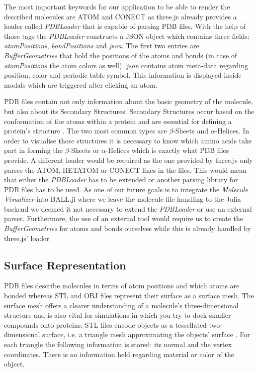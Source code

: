 The most important keywords for our application to be able to render the described molecules are ATOM and CONECT as three.js already provides a loader called \textit{PDBLoader} that is capable of parsing PDB files. With the help of those tags the \textit{PDBLoader} constructs a JSON object which contains three fields: \textit{atomPositions}, \textit{bondPositions} and \textit{json}. The first two entries are \textit{BufferGeometries} that hold the positions of the atoms and bonds (in case of \textit{atomPositions} the atom colors as well). \textit{json} contains atom meta-data regarding position, color and periodic table symbol. This information is displayed inside modals which are triggered after clicking an atom. 

PDB files contain not only information about the basic geometry of the molecule, but also about its Secondary Structures. Secondary Structures occur based on the conformation of the atoms within a protein and are essential for defining a protein's structure \cite{DEGREVE2014384, 10.3389/fbioe.2021.687426}. The two most common types are $\beta$-Sheets and $\alpha$-Helices. In order to visualise those structures it is necessary to know which amino acids take part in forming the $\beta$-Sheets or $\alpha$-Helices which is exactly what PDB files provide. A different loader would be required as the one provided by three.js only parses the ATOM, HETATOM or CONECT lines in the files. This would mean that either the \textit{PDBLoader} has to be extended or another parsing library for PDB files has to be used. As one of our future goals is to integrate the \textit{Molecule Visualizer} into BALL.jl where we leave the molecule file handling to the Julia backend we deemed it not necessary to extend the \textit{PDBLoader} or use an external parser. Furthermore, the use of an external tool would require us to create the \textit{BufferGeometries} for atoms and bonds ourselves while this is already handled by three.js' loader. 

\subsection{Surface Representation}
\label{sec:implementation:molrepr:surface}

PDB files describe molecules in terms of atom positions and which atoms are bonded whereas STL and OBJ files represent their surface as a surface mesh. The surface mesh offers a clearer understanding of a molecule's three-dimensional structure and is also vital for simulations in which you try to dock smaller compounds onto proteins. STL files encode objects as a tessellated two-dimensional surface, i.e. a triangle mesh approximating the objects' surface \cite{SZILVSINAGY2003945}. For each triangle the following information is stored: its normal and the vertex coordinates. There is no information held regarding material or color of the object.

